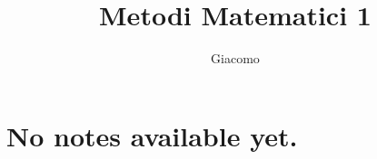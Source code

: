 \documentclass{article}
\title{Metodi Matematici 1}
\author{Giacomo}
\begin{document}
\maketitle

\section*{No notes available yet.}
\end{document}
